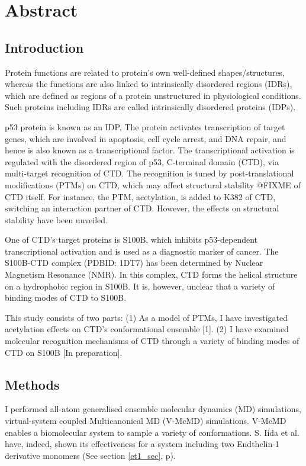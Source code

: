 \chapter*{Abstract}
\section*{Introduction}
Protein functions are related to protein's own well-defined shapes/structures, whereas the functions are also linked to intrinsically disordered regions (IDRs), which are defined as regions of a protein unstructured in physiological conditions. Such proteins including IDRs are called intrinsically disordered proteins (IDPs).

p53 protein is known as an IDP. The protein activates transcription of target genes, which are involved in apoptosis, cell cycle arrest, and DNA repair, and hence is also known as a transcriptional factor. 
The transcriptional activation is regulated with the disordered region of p53, C-terminal domain (CTD), via multi-target recognition of CTD. The recognition is tuned by post-translational modifications (PTMs) on CTD, which may affect {\color{red}structural stability @FIXME} of CTD itself. For instance, the PTM, acetylation, is added to K382 of CTD, switching an interaction partner of CTD. However, the effects on structural stability have been unveiled.

One of CTD’s target proteins is S100B, which inhibits p53-dependent transcriptional activation and is used as a diagnostic marker of cancer. The S100B-CTD complex (PDBID: 1DT7) has been determined by Nuclear Magnetism Resonance (NMR). In this complex, CTD forms the helical structure on a hydrophobic region in S100B. It is, however, unclear that a variety of binding modes of CTD to S100B.

This study consists of two parts: (1) As a model of PTMs, I have investigated acetylation effects on CTD’s conformational ensemble [1]. (2) I have examined molecular recognition mechanisms of CTD through a variety of binding modes of CTD on S100B [In preparation].

\section*{Methods}
I performed all-atom generalised ensemble molecular dynamics (MD) simulations, virtual-system coupled Multicanonical MD (V-McMD) simulations. V-McMD enables a biomolecular system to sample a variety of conformations. S. Iida et al. have, indeed, shown its effectiveness for a system including two Endthelin-1 derivative monomers (See section \ref{et1_sec}, p\pageref{et1_sec}).

